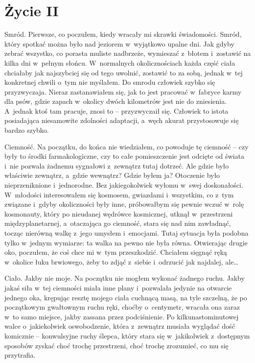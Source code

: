 \chapter{Życie II}

Smród. Pierwsze, co poczułem, kiedy wracały mi skrawki świadomości. Smród, który spotkać można było nad jeziorem 
w~wyjątkowo upalne dni. Jak gdyby zebrać wszystko, co porasta muliste nadbrzeże, wymieszać z~błotem i~zostawić na kilka 
dni w~pełnym słońcu. W~normalnych okolicznościach każda część ciała chciałaby jak najszybciej się od tego uwolnić, 
zostawić to za sobą, jednak w~tej konkretnej chwili o~tym nie myślałem. Do smrodu człowiek szybko się przyzwyczaja. 
Nieraz zastanawiałem się, jak to jest pracować w~fabryce karmy dla psów, gdzie zapach w~okolicy dwóch kilometrów jest 
nie do zniesienia. A~jednak ktoś tam pracuje, znosi to -- przyzwyczaił się. Człowiek to istota posiadająca 
niesamowite zdolności adaptacji, a~węch akurat przystosowuje się bardzo szybko. 

Ciemność. Na początku, do końca nie wiedziałem, co powoduje tę ciemność -- czy były to środki farmakologiczne, czy to 
całe pomieszczenie jest odcięte od świata i~nie pozwala żadnemu sygnałowi z~zewnątrz tutaj dotrzeć. Ale gdzie było 
właściwie zewnątrz, a~gdzie wewnątrz? Gdzie byłem ja? Otoczenie było nieprzeniknione i~jednorodne. Bez jakiegokolwiek 
wyłomu w~swej doskonałości. W~młodości interesowałem się kosmosem, gwiazdami i~wszystkim, co z~tym związane i~gdyby 
okoliczności były inne, próbowałbym się pewnie wczuć w~rolę kosmonauty, który po nieudanej wędrówce kosmicznej, 
utknął w~przestrzeni międzyplanetarnej, a~otaczająca go ciemność, stara się nad nim zawładnąć, tocząc nierówną walkę 
z~jego umysłem i~emocjami. Tutaj sytuacja była podobna tylko w~jednym wymiarze: ta walka na pewno nie była równa. 
Otwierając drugie oko, poczułem, że coś chce mi w~tym przeszkodzić. Chciałem sięgnąć ręką w~okolice łuku brwiowego, 
żeby to zdjąć z~siebie i~odrzucić jak najdalej, ale… 

Ciało. Jakby nie moje. Na początku nie mogłem wykonać żadnego ruchu. Jakby jakaś siła w~tej ciemności miała inne 
plany i~pozwalała jedynie na otwarcie jednego oka, krępując resztę mojego ciała cuchnącą masą, na tyle szczelną, że 
po początkowym gwałtownym ruchu ręki, choćby o~centymetr, wracała ona zaraz w~to samo miejsce, jakby zassana przez 
podciśnienie. Po kilkunastominutowej walce o~jakiekolwiek oswobodzenie, która z~zewnątrz musiała wyglądać dość 
komicznie -- konwulsyjne ruchy ślepca, który stara się w~jakikolwiek z~dostępnym sposobów zyskać choć trochę 
przestrzeni, choć trochę zrozumieć, co mu się przytrafia. 

